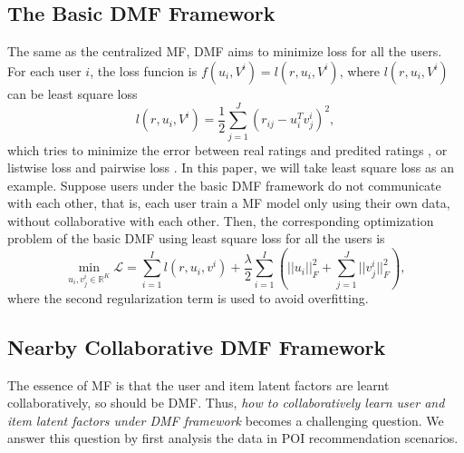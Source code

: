 \subsection{The Basic DMF Framework}
The same as the centralized MF, DMF aims to minimize loss for all the users. 
For each user $i$, the loss funcion is $f(u_i,V^i)=l(r,u_i,V^i)$, where $l(r,u_i,V^i)$ can be least square loss
\begin{equation}
l(r,u_i,V^i)=\frac{1}{2}\sum\limits_{j=1}^{J}{\left(r_{ij} - u_i^T v^i_j\right)}^2,
\end{equation} 
which tries to minimize the error between real ratings and predited ratings \cite{mnih2007probabilistic}, 
or listwise loss 
\cite{shi2010list}
and pairwise loss \cite{rendle2009bpr}. 
In this paper, we will take least square loss as an example. 
Suppose users under the basic DMF framework do not communicate with each other, that is, each user train a MF model only using their own data, without collaborative with each other. 
Then, the corresponding optimization problem of the basic DMF using least square loss for all the users is
\begin{equation}\label{basicdmf}
\mathop { \min }\limits_{u_i,v^i_j \in \mathbb{R}^K} \mathcal{L} = \sum\limits_{i=1}^{I} l(r,u_i,v^i) + \frac{\lambda}{2} \sum\limits_{i=1}^I \left( ||{u_i}||_F^2 + \sum\limits_{j=1}^J||v^i_j||_F^2 \right),
\end{equation} 
where the second regularization term is used to avoid overfitting. 

\subsection{Nearby Collaborative DMF Framework}
The essence of MF is that the user and item latent factors are learnt collaboratively, so should be DMF. 
Thus, \textit{how to collaboratively learn user and item latent factors under DMF framework} becomes a challenging question. 
We answer this question by first analysis the data in POI recommendation scenarios. 



